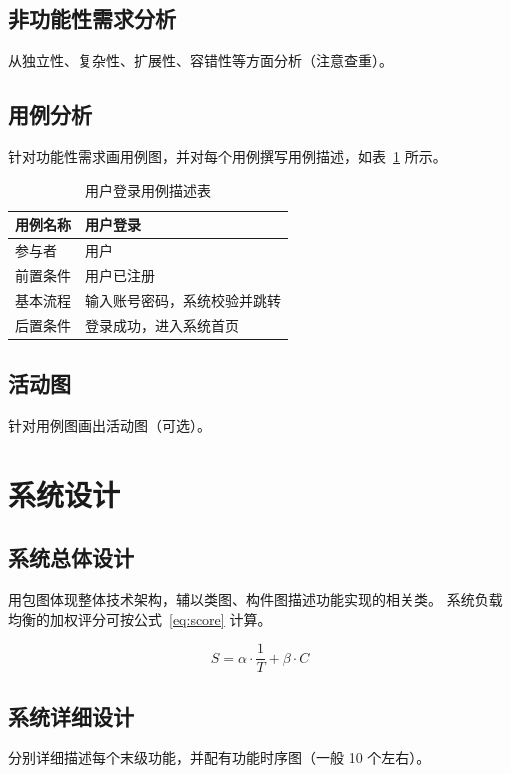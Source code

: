 \documentclass[fandol]{izdthesis}
\begin{document}
\section{非功能性需求分析}
从独立性、复杂性、扩展性、容错性等方面分析（注意查重）。

\section{用例分析}
针对功能性需求画用例图，并对每个用例撰写用例描述，如表~\ref{tab:usecase} 所示。

\begin{table}[htbp]
  \centering
  \caption{用户登录用例描述表}
  \label{tab:usecase}
  \songti
  \begin{tabular}{|l|l|}
    \hline
    用例名称 & 用户登录 \\ \hline
    参与者   & 用户     \\ \hline
    前置条件 & 用户已注册 \\ \hline
    基本流程 & 输入账号密码，系统校验并跳转 \\ \hline
    后置条件 & 登录成功，进入系统首页 \\ \hline
  \end{tabular}
\end{table}

\section{活动图}
针对用例图画出活动图（可选）。

\chapter{系统设计}

\section{系统总体设计}
用包图体现整体技术架构，辅以类图、构件图描述功能实现的相关类。
系统负载均衡的加权评分可按公式~\ref{eq:score} 计算。

\begin{equation}
  S = \alpha \cdot \frac{1}{T} + \beta \cdot C
  \label{eq:score}
\end{equation}

\section{系统详细设计}
分别详细描述每个末级功能，并配有功能时序图（一般 10 个左右）。
\end{document}
